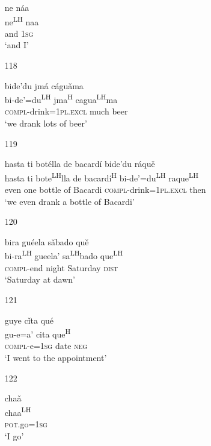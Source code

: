 \begin{itemize}
\glll ne n\'{a}a \\
ne\textsuperscript{LH} naa \\
and 1\textsc{sg} \\
\glt  `and I'



\item[118]

\glll bide'du jm\'{a} c\'{a}gu\v{a}ma \\
bi-de'=du\textsuperscript{LH} jma\textsuperscript{H} cagua\textsuperscript{LH}ma \\
\textsc{compl}-drink=1\textsc{pl.excl} much beer \\
\glt  `we drank lots of beer'  



\item[119]
 
\glll   hasta ti bot\'{e}lla de bacard\'{i} bide'du r\'{a}qu\v{e}\\
hasta ti bote\textsuperscript{LH}lla de bacard\'{i}\textsuperscript{H} bi-de'=du\textsuperscript{LH} raque\textsuperscript{LH}\\
even one bottle of Bacardi \textsc{compl}-drink=\textsc{1pl.excl} then\\
\glt `we even drank a bottle of Bacardi' 
 



\item[120]
 
\glll   bira gu\'{e}ela s\v{a}bado qu\v{e}  \\
 bi-ra\textsuperscript{LH} gueela' sa\textsuperscript{LH}bado que\textsuperscript{LH} \\
\textsc{compl}-end night Saturday \textsc{dist}\\
\glt `Saturday at dawn'
 


\item[121]
 
\glll   guye c\v{i}ta qu\'{e}  \\
gu-e=a' cita que\textsuperscript{H} \\
\textsc{compl}-e=\textsc{1sg} date \textsc{neg}\\
\glt `I went to the appointment'
 

\item[122]
 
\glll   cha\v{a} \\
chaa\textsuperscript{LH}\\
\textsc{pot}.go=\textsc{1sg}\\
\glt `I go'
 



\end{itemize}
